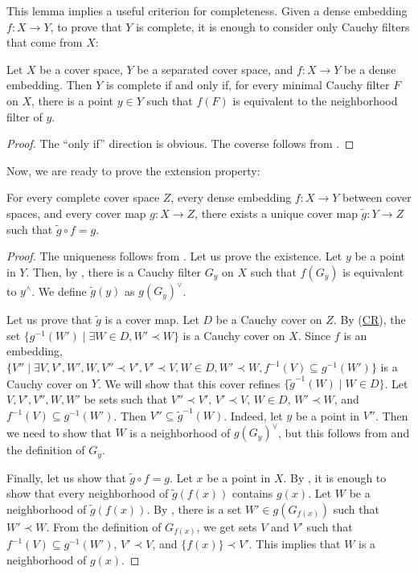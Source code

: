 \documentclass[reqno]{amsart}
\newcommand{\axref}[1]{(\hyperref[ax:#1]{#1})}
\theoremstyle{definition}
\theoremstyle{remark}
\numberwithin{figure}{section}
\newcommand{\rb}{\prec}
\begin{document}
This lemma implies a useful criterion for completeness.
Given a dense embedding $f : X \to Y$, to prove that $Y$ is complete, it is enough to consider only Cauchy filters that come from $X$:

\begin{lem}
Let $X$ be a cover space, $Y$ be a separated cover space, and $f : X \to Y$ be a dense embedding.
Then $Y$ is complete if and only if, for every minimal Cauchy filter $F$ on $X$, there is a point $y \in Y$ such that $f(F)$ is equivalent to the neighborhood filter of $y$.
\end{lem}
\begin{proof}
The ``only if'' direction is obvious.
The coverse follows from .
\end{proof}

Now, we are ready to prove the extension property:

\begin{thm}
For every complete cover space $Z$, every dense embedding $f : X \to Y$ between cover spaces, and every cover map $g : X \to Z$,
there exists a unique cover map $\widetilde{g} : Y \to Z$ such that $\widetilde{g} \circ f = g$.
\end{thm}
\begin{proof}
The uniqueness follows from .
Let us prove the existence.
Let $y$ be a point in $Y$.
Then, by , there is a Cauchy filter $G_y$ on $X$ such that $f(G_y)$ is equivalent to $y^\wedge$.
We define $\widetilde{g}(y)$ as $g(G_y)^\vee$.

Let us prove that $\widetilde{g}$ is a cover map.
Let $D$ be a Cauchy cover on $Z$.
By \axref{CR}, the set $\{ g^{-1}(W') \mid \exists W \in D, W' \rb W \}$ is a Cauchy cover on $X$.
Since $f$ is an embedding, $\{ V'' \mid \exists V,V',W',W, V'' \rb V', V' \rb V, W \in D, W' \rb W, f^{-1}(V) \subseteq g^{-1}(W') \}$ is a Cauchy cover on $Y$.
We will show that this cover refines $\{ \widetilde{g}^{-1}(W) \mid W \in D \}$.
Let $V,V',V'',W,W'$ be sets such that $V'' \rb V'$, $V' \rb V$, $W \in D$, $W' \rb W$, and $f^{-1}(V) \subseteq g^{-1}(W')$.
Then $V'' \subseteq \widetilde{g}^{-1}(W)$.
Indeed, let $y$ be a point in $V''$.
Then we need to show that $W$ is a neighborhood of $g(G_y)^\vee$, but this follows from  and the definition of $G_y$.

Finally, let us show that $\widetilde{g} \circ f = g$.
Let $x$ be a point in $X$.
By , it is enough to show that every neighborhood of $\widetilde{g}(f(x))$ contains $g(x)$.
Let $W$ be a neighborhood of $\widetilde{g}(f(x))$.
By , there is a set $W' \in g(G_{f(x)})$ such that $W' \rb W$.
From the definition of $G_{f(x)}$, we get sets $V$ and $V'$ such that $f^{-1}(V) \subseteq g^{-1}(W')$, $V' \rb V$, and $\{ f(x) \} \rb V'$.
This implies that $W$ is a neighborhood of $g(x)$.
\end{proof}
\end{document}
